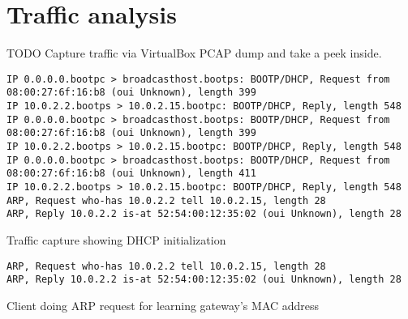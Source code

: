 
\section{Traffic analysis}

TODO Capture traffic via VirtualBox PCAP dump and take a peek inside.

\begin{table}[!ht]
  \label{tab:dhcp_request}
  \begin{adjustwidth}{-3.5cm}{}
    \begin{scriptsize}
\begin{verbatim}
IP 0.0.0.0.bootpc > broadcasthost.bootps: BOOTP/DHCP, Request from 08:00:27:6f:16:b8 (oui Unknown), length 399
IP 10.0.2.2.bootps > 10.0.2.15.bootpc: BOOTP/DHCP, Reply, length 548
IP 0.0.0.0.bootpc > broadcasthost.bootps: BOOTP/DHCP, Request from 08:00:27:6f:16:b8 (oui Unknown), length 399
IP 10.0.2.2.bootps > 10.0.2.15.bootpc: BOOTP/DHCP, Reply, length 548
IP 0.0.0.0.bootpc > broadcasthost.bootps: BOOTP/DHCP, Request from 08:00:27:6f:16:b8 (oui Unknown), length 411
IP 10.0.2.2.bootps > 10.0.2.15.bootpc: BOOTP/DHCP, Reply, length 548
ARP, Request who-has 10.0.2.2 tell 10.0.2.15, length 28
ARP, Reply 10.0.2.2 is-at 52:54:00:12:35:02 (oui Unknown), length 28
\end{verbatim}
    \end{scriptsize}
  \end{adjustwidth}
  \begin{center}
    \caption{Traffic capture showing DHCP initialization}
  \end{center}
\end{table}

\begin{table}[!ht]
  \label{tab:dhcp_request}
  \begin{adjustwidth}{-3.5cm}{}
    \begin{scriptsize}
\begin{verbatim}
ARP, Request who-has 10.0.2.2 tell 10.0.2.15, length 28
ARP, Reply 10.0.2.2 is-at 52:54:00:12:35:02 (oui Unknown), length 28
\end{verbatim}
    \end{scriptsize}
  \end{adjustwidth}
  \begin{center}
    \caption{Client doing ARP request for learning gateway's MAC address}
  \end{center}
\end{table}


